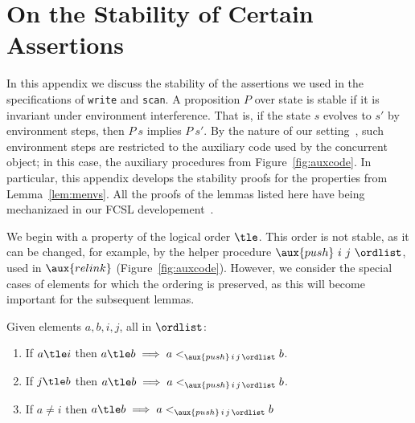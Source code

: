 \section{On the Stability of Certain Assertions}
\label{sc:coq-code}

\newcommand\chainjleq[2]{\hist^{\hbox{}\sqsubseteq_{#2} {#1}}}
\newcommand\chainjltn[2]{\hist^{\hbox{}\sqsubsetneq_{#2} {#1}}}
\newcommand\chaintleq[2]{\hist^{\hbox{}\leq_{#2} {#1}}}
\def\cat{{\mathrel{+\!\!+}}}

In this appendix we discuss the stability of the assertions we used in
the specifications of {\tt write} and {\tt scan}. A proposition $P$
over state is stable if it is invariant under environment
interference. That is, if the state $s$ evolves to $s'$ by environment
steps, then $P\ s$ implies $P\ s'$. By the nature of our
setting~\cite{Nanevski-al:ESOP14}, such environment steps are
restricted to the auxiliary code used by the concurrent object; in
this case, the auxiliary procedures from Figure~\ref{fig:auxcode}. In
particular, this appendix develops the stability proofs for the
properties from Lemma~\ref{lem:menvs}. All the proofs of the lemmas
listed here have being mechanizaed in our FCSL developement~\cite{CoqFiles}.

We begin with a property of the logical order $\tle$. This order is
not stable, as it can be changed, for example, by the helper procedure
$\aux{push}\ i\ j\ \ordlist$, used in $\aux{relink}$
(Figure~\ref{fig:auxcode}). However, we consider the special cases of
elements for which the ordering is preserved, as this will become
important for the subsequent lemmas.



\begin{lemma}\label{lem:push-mono}
Given elements $a, b, i, j$, all in $\ordlist$:
\begin{enumerate}
\item\label{lem:push:left} If $a \tle i$ then $ a \tle b \implies a
  <_{\aux{push}\, i\, j\, \ordlist} b$. 
\item\label{lem:push:right} If $j \tle b$ then $ a \tle b \implies a
  <_{\aux{push}\, i\, j\, \ordlist} b $.
\item\label{lem:push:window} If $a \neq i$ then $ a \tle b \implies a
  <_{\aux{push}\, i\, j\, \ordlist} b $
\end{enumerate}
\end{lemma}

